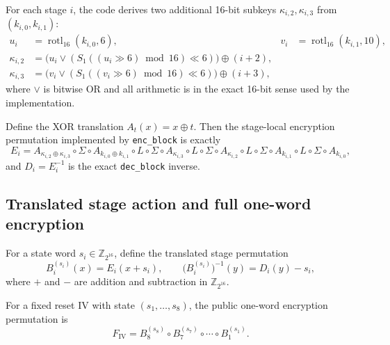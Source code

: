 \documentclass[11pt]{article}
\newcommand{\Z}[1]{\mathbb{Z}_{#1}}
\newcommand{\rot}{\operatorname{rotl}_{16}}
\begin{document}
For each stage $i$, the code derives two additional 16-bit subkeys $\kappa_{i,2},\kappa_{i,3}$ from $(k_{i,0},k_{i,1})$:
\begin{align*}
u_i &= \rot(k_{i,0},6),&
v_i &= \rot(k_{i,1},10),\\
\kappa_{i,2} &= \bigl(u_i \vee (S_1((u_i \gg 6)\bmod 16)\ll 6)\bigr)\oplus (i+2),\\
\kappa_{i,3} &= \bigl(v_i \vee (S_1((v_i \gg 6)\bmod 16)\ll 6)\bigr)\oplus (i+3),
\end{align*}
where $\vee$ is bitwise OR and all arithmetic is in the exact 16-bit sense used by the implementation.

Define the XOR translation $A_t(x)=x\oplus t$. Then the stage-local encryption permutation implemented by \texttt{enc\_block} is exactly
\begin{equation}
\label{eq:stage-enc}
E_i
=
A_{\kappa_{i,2}\oplus \kappa_{i,3}}
\circ \Sigma
\circ A_{k_{i,0}\oplus k_{i,1}}
\circ L
\circ \Sigma
\circ A_{\kappa_{i,3}}
\circ L
\circ \Sigma
\circ A_{\kappa_{i,2}}
\circ L
\circ \Sigma
\circ A_{k_{i,1}}
\circ L
\circ \Sigma
\circ A_{k_{i,0}},
\end{equation}
and $D_i=E_i^{-1}$ is the exact \texttt{dec\_block} inverse.

\subsection{Translated stage action and full one-word encryption}
For a state word $s_i\in\Z{2^{16}}$, define the translated stage permutation
\[
B_i^{(s_i)}(x)=E_i(x+s_i),
\qquad
\bigl(B_i^{(s_i)}\bigr)^{-1}(y)=D_i(y)-s_i,
\]
where $+$ and $-$ are addition and subtraction in $\Z{2^{16}}$.

For a fixed reset IV with state $(s_1,\dots,s_8)$, the public one-word encryption permutation is
\[
F_{\mathrm{IV}}
=
B_8^{(s_8)}
\circ B_7^{(s_7)}
\circ \cdots \circ
B_1^{(s_1)}.
\]
\end{document}
